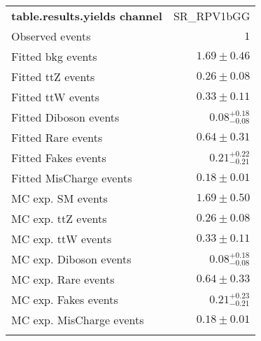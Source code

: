 

\begin{table}
\begin{center}
\setlength{\tabcolsep}{0.0pc}
{\small
\begin{tabular*}{\textwidth}{@{\extracolsep{\fill}}lr}
\noalign{\smallskip}\hline\noalign{\smallskip}
{\bf table.results.yields channel}           & SR\_RPV1bGG              \\[-0.05cm]
\noalign{\smallskip}\hline\noalign{\smallskip}
Observed events          & $1$                    \\
\noalign{\smallskip}\hline\noalign{\smallskip}
Fitted bkg events         & $1.69 \pm 0.46$              \\
\noalign{\smallskip}\hline\noalign{\smallskip}
        Fitted ttZ events         & $0.26 \pm 0.08$              \\
        Fitted ttW events         & $0.33 \pm 0.11$              \\
        Fitted Diboson events         & $0.08_{-0.08}^{+0.18}$              \\
        Fitted Rare events         & $0.64 \pm 0.31$              \\
        Fitted Fakes events         & $0.21_{-0.21}^{+0.22}$              \\
        Fitted MisCharge events         & $0.18 \pm 0.01$              \\
 \noalign{\smallskip}\hline\noalign{\smallskip}
MC exp. SM events              & $1.69 \pm 0.50$              \\
\noalign{\smallskip}\hline\noalign{\smallskip}
        MC exp. ttZ events         & $0.26 \pm 0.08$              \\
        MC exp. ttW events         & $0.33 \pm 0.11$              \\
        MC exp. Diboson events         & $0.08_{-0.08}^{+0.18}$              \\
        MC exp. Rare events         & $0.64 \pm 0.33$              \\
        MC exp. Fakes events         & $0.21_{-0.21}^{+0.23}$              \\
        MC exp. MisCharge events         & $0.18 \pm 0.01$              \\
\noalign{\smallskip}\hline\noalign{\smallskip}
\end{tabular*}
}
\end{center}

\end{table}
